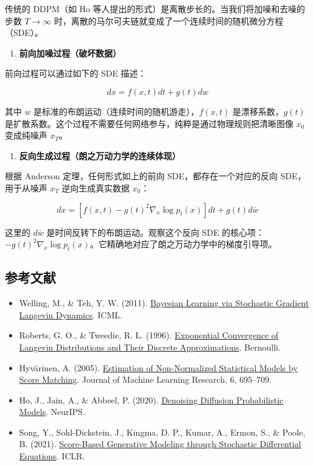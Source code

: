 传统的 DDPM（如 Ho 等人提出的形式）是离散步长的。当我们将加噪和去噪的步数 \(T\to\infty\) 时，离散的马尔可夫链就变成了一个连续时间的随机微分方程（SDE）。

\begin{enumerate}
\def\labelenumi{\arabic{enumi}.}
\tightlist
\item
  \textbf{前向加噪过程（破坏数据）}
\end{enumerate}

前向过程可以通过如下的 SDE 描述：

\[
dx=f(x,t)dt+g(t)dw
\]

其中 \(w\) 是标准的布朗运动（连续时间的随机游走），\(f(x,t)\) 是漂移系数，\(g(t)\) 是扩散系数。这个过程不需要任何网络参与，纯粹是通过物理规则把清晰图像 \(x_0\) 变成纯噪声 \(x_T\)。

\begin{enumerate}
\def\labelenumi{\arabic{enumi}.}
\setcounter{enumi}{1}
\tightlist
\item
  \textbf{反向生成过程（朗之万动力学的连续体现）}
\end{enumerate}

根据 Anderson 定理，任何形式如上的前向 SDE，都存在一个对应的反向 SDE，用于从噪声 \(x_T\) 逆向生成真实数据 \(x_0\)：

\[
dx=\left[f(x,t)-g(t)^2\nabla_x\log p_t(x)\right]dt+g(t)d\bar{w}
\]

这里的 \(d\bar{w}\) 是时间反转下的布朗运动。观察这个反向 SDE 的核心项：\(-g(t)^2\nabla_x\log p_t(x)\)。它精确地对应了朗之万动力学中的梯度引导项。

\hypertarget{ux53c2ux8003ux6587ux732e-129}{%
\subsection{参考文献}\label{ux53c2ux8003ux6587ux732e-129}}

\vspace{0.25em}
\begin{itemize}
\tightlist
\item
  Welling, M., \& Teh, Y. W. (2011). \href{https://www.stats.ox.ac.uk/~teh/research/compstats/WelTeh2011a.pdf}{Bayesian Learning via Stochastic Gradient Langevin Dynamics}. ICML.
\item
  Roberts, G. O., \& Tweedie, R. L. (1996). \href{https://doi.org/10.2307/3318418}{Exponential Convergence of Langevin Distributions and Their Discrete Approximations}. Bernoulli.
\item
  Hyvärinen, A. (2005). \href{https://www.jmlr.org/papers/v6/hyvarinen05a.html}{Estimation of Non-Normalized Statistical Models by Score Matching}. Journal of Machine Learning Research, 6, 695--709.
\item
  Ho, J., Jain, A., \& Abbeel, P. (2020). \href{https://arxiv.org/abs/2006.11239}{Denoising Diffusion Probabilistic Models}. NeurIPS.
\item
  Song, Y., Sohl-Dickstein, J., Kingma, D. P., Kumar, A., Ermon, S., \& Poole, B. (2021). \href{https://arxiv.org/abs/2011.13456}{Score-Based Generative Modeling through Stochastic Differential Equations}. ICLR.
\end{itemize}

